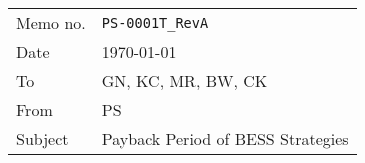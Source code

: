\begin{tabular}{ll}
Memo no. & \texttt{PS-0001T\_RevA} \\
Date & \today \\
To & GN, KC, MR, BW, CK \\
From & PS \\
Subject & Payback Period of BESS Strategies \\
\end{tabular}

